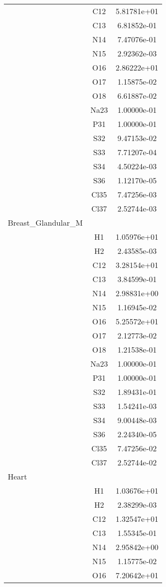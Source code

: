 \begin{centering}
\begin{longtable}{l c c}
& C12 & 5.81781e+01 \\ 
& C13 & 6.81852e-01 \\ 
& N14 & 7.47076e-01 \\ 
& N15 & 2.92362e-03 \\ 
& O16 & 2.86222e+01 \\ 
& O17 & 1.15875e-02 \\ 
& O18 & 6.61887e-02 \\ 
& Na23 & 1.00000e-01 \\ 
& P31 & 1.00000e-01 \\ 
& S32 & 9.47153e-02 \\ 
& S33 & 7.71207e-04 \\ 
& S34 & 4.50224e-03 \\ 
& S36 & 1.12170e-05 \\ 
& Cl35 & 7.47256e-03 \\ 
& Cl37 & 2.52744e-03 \\ 
\hline
Breast\_Glandular\_M & & \\
\hline
& H1 & 1.05976e+01 \\ 
& H2 & 2.43585e-03 \\ 
& C12 & 3.28154e+01 \\ 
& C13 & 3.84599e-01 \\ 
& N14 & 2.98831e+00 \\ 
& N15 & 1.16945e-02 \\ 
& O16 & 5.25572e+01 \\ 
& O17 & 2.12773e-02 \\ 
& O18 & 1.21538e-01 \\ 
& Na23 & 1.00000e-01 \\ 
& P31 & 1.00000e-01 \\ 
& S32 & 1.89431e-01 \\ 
& S33 & 1.54241e-03 \\ 
& S34 & 9.00448e-03 \\ 
& S36 & 2.24340e-05 \\ 
& Cl35 & 7.47256e-02 \\ 
& Cl37 & 2.52744e-02 \\ 
\hline
Heart & & \\
\hline
& H1 & 1.03676e+01 \\ 
& H2 & 2.38299e-03 \\ 
& C12 & 1.32547e+01 \\ 
& C13 & 1.55345e-01 \\ 
& N14 & 2.95842e+00 \\ 
& N15 & 1.15775e-02 \\ 
& O16 & 7.20642e+01 \\ 

\end{longtable}
\end{centering}
